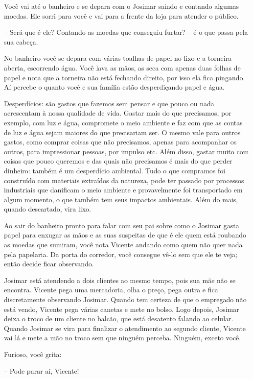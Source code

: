 Você vai até o banheiro e se depara com o Josimar saindo e contando algumas moedas. Ele sorri para você e vai para a frente da loja para atender o público.

-- Será que é ele? Contando as moedas que conseguiu furtar? -- é o que passa pela sua cabeça.

No banheiro você se depara com várias toalhas de papel no lixo e a torneira aberta, escorrendo água. Você lava as mãos, as seca com apenas duas folhas de papel e nota que a torneira não está fechando direito, por isso ela fica pingando. Aí percebe o quanto você e sua família estão desperdiçando papel e água.

Desperdícios: são gastos que fazemos sem pensar e que pouco ou nada acrescentam à nossa qualidade de vida. Gastar mais do que precisamos, por exemplo, com luz e água, compromete o meio ambiente e faz com que as contas de luz e água sejam maiores do que precisariam ser. O mesmo vale para outros gastos, como comprar coisas que não precisamos, apenas para acompanhar os outros, para impressionar pessoas, por impulso etc. Além disso, gastar muito com coisas que pouco queremos e das quais não precisamos é mais do que perder dinheiro: também é um desperdício ambiental. Tudo o que compramos foi construído com materiais extraídos da natureza, pode ter passado por processos industriais que danificam o meio ambiente e provavelmente foi transportado em algum momento, o que também tem seus impactos ambientais. Além do mais, quando descartado, vira lixo.

Ao sair do banheiro pronto para falar com seu pai sobre como o Josimar gasta papel
para enxugar as mãos e as suas suspeitas de que é ele quem está roubando as moedas
que sumiram, você nota Vicente andando como quem não quer nada pela papelaria.
Da porta do corredor, você consegue vê-lo sem que ele te veja; então decide ficar observando.

Josimar está atendendo a dois clientes ao mesmo tempo, pois sua mãe não se encontra. Vicente pega uma mercadoria, olha o preço, pega outra e fica discretamente observando Josimar. Quando tem certeza de que o empregado não está vendo, Vicente pega várias canetas e mete no bolso. Logo depois, Josimar deixa o troco de um cliente no balcão, que está desatento falando ao celular. Quando Josimar se vira para finalizar o atendimento ao segundo cliente, Vicente vai lá e mete a mão no troco sem que ninguém perceba. Ninguém, exceto você.

Furioso, você grita:

-- Pode parar aí, Vicente!


